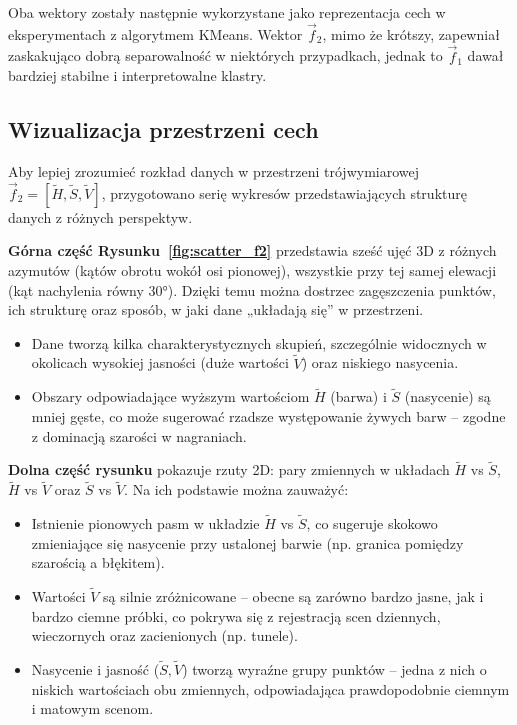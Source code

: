 \documentclass[12pt]{article}
\begin{document}
Oba wektory zostały następnie wykorzystane jako reprezentacja cech w eksperymentach z algorytmem KMeans. Wektor \(\vec{f}_2\), mimo że krótszy, zapewniał zaskakująco dobrą separowalność w niektórych przypadkach, jednak to \(\vec{f}_1\) dawał bardziej stabilne i interpretowalne klastry.

\subsection{Wizualizacja przestrzeni cech}

Aby lepiej zrozumieć rozkład danych w przestrzeni trójwymiarowej \(\vec{f}_2 = [\widetilde{H}, \widetilde{S}, \widetilde{V}]\), przygotowano serię wykresów przedstawiających strukturę danych z różnych perspektyw.

\textbf{Górna część Rysunku~\ref{fig:scatter_f2}} przedstawia sześć ujęć 3D z różnych azymutów (kątów obrotu wokół osi pionowej), wszystkie przy tej samej elewacji (kąt nachylenia równy 30°). Dzięki temu można dostrzec zagęszczenia punktów, ich strukturę oraz sposób, w jaki dane „układają się” w przestrzeni.

\begin{itemize}
    \item Dane tworzą kilka charakterystycznych skupień, szczególnie widocznych w okolicach wysokiej jasności (duże wartości \(\widetilde{V}\)) oraz niskiego nasycenia.
    \item Obszary odpowiadające wyższym wartościom \(\widetilde{H}\) (barwa) i \(\widetilde{S}\) (nasycenie) są mniej gęste, co może sugerować rzadsze występowanie żywych barw – zgodne z dominacją szarości w nagraniach.
\end{itemize}

\textbf{Dolna część rysunku} pokazuje rzuty 2D: pary zmiennych w układach \(\widetilde{H}\) vs \(\widetilde{S}\), \(\widetilde{H}\) vs \(\widetilde{V}\) oraz \(\widetilde{S}\) vs \(\widetilde{V}\). Na ich podstawie można zauważyć:

\begin{itemize}
    \item Istnienie pionowych pasm w układzie \(\widetilde{H}\) vs \(\widetilde{S}\), co sugeruje skokowo zmieniające się nasycenie przy ustalonej barwie (np. granica pomiędzy szarością a błękitem).
    \item Wartości \(\widetilde{V}\) są silnie zróżnicowane – obecne są zarówno bardzo jasne, jak i bardzo ciemne próbki, co pokrywa się z rejestracją scen dziennych, wieczornych oraz zacienionych (np. tunele).
    \item Nasycenie i jasność (\(\widetilde{S}, \widetilde{V}\)) tworzą wyraźne grupy punktów – jedna z nich o niskich wartościach obu zmiennych, odpowiadająca prawdopodobnie ciemnym i matowym scenom.
\end{itemize}
\end{document}
